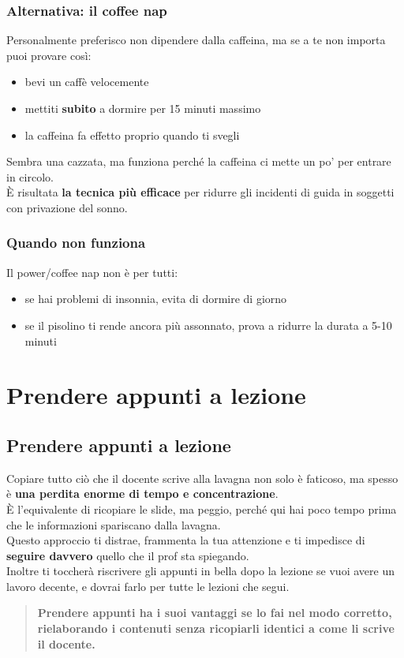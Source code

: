 \documentclass[18pt]{extarticle}
\begin{document}
\subsubsection{Alternativa: il coffee nap}
Personalmente preferisco non dipendere dalla caffeina, ma se a te non importa puoi provare così:
\begin{itemize}
\item bevi un caffè velocemente
\item mettiti \textbf{subito} a dormire per 15 minuti massimo
\item la caffeina fa effetto proprio quando ti svegli
\end{itemize}
Sembra una cazzata, ma funziona perché la caffeina ci mette un po' per entrare in circolo.\\
È risultata \textbf{la tecnica più efficace} per ridurre gli incidenti di guida in soggetti con privazione del sonno.


\subsubsection{Quando non funziona}
Il power/coffee nap non è per tutti:
\begin{itemize}
\item se hai problemi di insonnia, evita di dormire di giorno
\item se il pisolino ti rende ancora più assonnato, prova a ridurre la durata a 5-10 minuti
\end{itemize}


\section{Prendere appunti a lezione}
\subsection{Prendere appunti a lezione}
Copiare tutto ciò che il docente scrive alla lavagna non solo è faticoso, ma spesso è \textbf{una perdita enorme di tempo e concentrazione}.\\
È l'equivalente di ricopiare le slide, ma peggio, perché qui hai poco tempo prima che le informazioni spariscano dalla lavagna.\\
Questo approccio ti distrae, frammenta la tua attenzione e ti impedisce di \textbf{seguire davvero} quello che il prof sta spiegando.\\
Inoltre ti toccherà riscrivere gli appunti in bella dopo la lezione se vuoi avere un lavoro decente, e dovrai farlo per tutte le lezioni che segui.
\begin{quote}
\textbf{Prendere appunti ha i suoi vantaggi se lo fai nel modo corretto, rielaborando i contenuti senza ricopiarli identici a come li scrive il docente.}
\end{quote}
\end{document}

